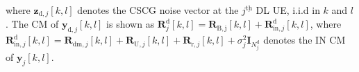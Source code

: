 \documentclass[9pt,journal]{IEEEtran}
\newcommand{\bracket}[1]{{\left [{#1}\right ]}}
\newcommand{\ith}[1]    {{#1}^{\underline{\text{th}}}}
\theoremstyle{definition}
\begin{document}
where $\mathbf{z}_{\textrm{d},j}\bracket{k,l}$ denotes the CSCG noise vector at the $\ith{j}$ DL UE, i.i.d in $k$ and $l$. The CM of $\mathbf{y}_{\textrm{d},j}\bracket{k,l}$ is shown as $\mathbf{R}^\mathrm{d}_j\bracket{k,l}=\mathbf{R}_{\mathrm{B,j}}\bracket{k,l}+\mathbf{R}^\mathrm{d}_{\mathrm{in,}j}\bracket{k,l}$, where $	\mathbf{R}^\textrm{d}_{\mathrm{in},j}\bracket{k,l}=\mathbf{R}_{\mathrm{dm},j}\bracket{k,l}+\mathbf{R}_{\mathrm{U,}j}\bracket{k,l}+\mathbf{R}_{\mathrm{r},j}\bracket{k,l}+\sigma^2_j\mathbf{I}_{\mathit{N}^{\textrm{d}}_j}$ denotes the IN CM of $\mathbf{y}_{j}\bracket{k,l}$.   %
	
\end{document}
